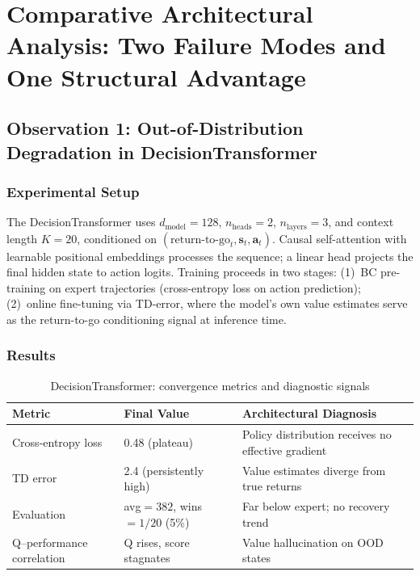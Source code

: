 \documentclass[11pt,a4paper]{article}
\theoremstyle{definition}
\begin{document}
\section{Comparative Architectural Analysis: Two Failure Modes and One Structural Advantage}

\subsection{Observation 1: Out-of-Distribution Degradation in DecisionTransformer}

\subsubsection{Experimental Setup}

The DecisionTransformer uses $d_{\text{model}}=128$, $n_{\text{heads}}=2$, $n_{\text{layers}}=3$, and context length $K=20$, conditioned on $(\text{return-to-go}_t, \mathbf{s}_t, \mathbf{a}_t)$.
Causal self-attention with learnable positional embeddings processes the sequence; a linear head projects the final hidden state to action logits.
Training proceeds in two stages: (1)~BC pre-training on expert trajectories (cross-entropy loss on action prediction); (2)~online fine-tuning via TD-error, where the model's own value estimates serve as the return-to-go conditioning signal at inference time.

\subsubsection{Results}

\begin{table}[ht]
\centering
\small
\caption{DecisionTransformer: convergence metrics and diagnostic signals}
\label{tab:dt-results}
\begin{tabular}{@{}p{3cm}p{3cm}p{5.5cm}@{}}
\toprule
\textbf{Metric} & \textbf{Final Value} & \textbf{Architectural Diagnosis} \\
\midrule
Cross-entropy loss & 0.48 (plateau) & Policy distribution receives no effective gradient \\
TD error & 2.4 (persistently high) & Value estimates diverge from true returns \\
Evaluation & avg$=382$, wins$=1/20$ (5\%) & Far below expert; no recovery trend \\
Q--performance correlation & Q rises, score stagnates & Value hallucination on OOD states \\
\bottomrule
\end{tabular}
\end{table}
\end{document}
